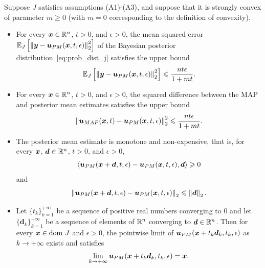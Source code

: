 \begin{prop} \label{prop:bounds_limits}
Suppose $J$ satisfies assumptions (A1)-(A3), and suppose that it is strongly convex of parameter $m \geqslant 0$ (with $m = 0$ corresponding to the definition of convexity).

\begin{itemize}
    \item[(i)] For every $\boldsymbol{x} \in \mathbb{R}^n$, $t>0$, and $\epsilon>0$, the mean squared error $\mathbb{E}_{J}\left [{\left\Vert{\boldsymbol{y}-\boldsymbol{u}_{PM}(\boldsymbol{x},t,\epsilon)} \right\Vert_{2}^{2}}\right]$ of the Bayesian posterior distribution~\eqref{eq:prob_dist_j} satisfies the upper bound 
    \begin{equation} \label{eq:mono_var_ub}
        \mathbb{E}_{J}\left [{\left\Vert{\boldsymbol{y}-\boldsymbol{u}_{PM}(\boldsymbol{x},t,\epsilon)} \right\Vert_{2}^{2}}\right] \leqslant \frac{nt\epsilon}{1+mt}.
    \end{equation}

    \item[(ii)] For every $\boldsymbol{x} \in \mathbb{R}^n$, $t>0$, and $\epsilon>0$, the squared difference between the MAP and posterior mean estimates satisfies the upper bound
    \begin{equation} \label{eq:difference_pm_map}
        \left\Vert{\boldsymbol{u}_{MAP}(\boldsymbol{x},t)-\boldsymbol{u}_{PM}(\boldsymbol{x},t,\epsilon)} \right\Vert_{2}^{2} \leqslant \frac{nt\epsilon}{1+mt}.
    \end{equation}
    
    \item[(iii)] The posterior mean estimate is monotone and non-expensive, that is, for every $\boldsymbol{x}$, $\boldsymbol{d} \in \mathbb{R}^n$, $t>0$, and $\epsilon>0$,
    \begin{equation} \label{eq:upm_monotone}
        \left\langle \boldsymbol{u}_{PM}(\boldsymbol{x} + \boldsymbol{d},t,\epsilon) - \boldsymbol{u}_{PM}(\boldsymbol{x},t,\epsilon), \boldsymbol{d} \right\rangle \geqslant 0
    \end{equation}
    and
    \begin{equation} \label{eq:lipschitz_cts}
         \left\Vert\boldsymbol{u}_{PM}(\boldsymbol{x} + \boldsymbol{d},t,\epsilon) -\boldsymbol{u}_{PM}(\boldsymbol{x},t,\epsilon)\right\Vert_2  \leqslant \left\Vert \boldsymbol{d}\right\Vert_2.
    \end{equation}
    \item[(iv)] Let $\{t_k\}_{k=1}^{+\infty}$ be a sequence of positive real numbers converging to $0$ and let $\{\boldsymbol{d}_k\}_{k=1}^{+\infty}$ be a sequence of elements of $\mathbb{R}^n$ converging to $\boldsymbol{d} \in \mathbb{R}^n$. Then for every $\boldsymbol{x} \in \mathrm{dom~} J$ and $\epsilon>0$, the pointwise limit of $\boldsymbol{u}_{PM}(\boldsymbol{x} + t_k\boldsymbol{d}_k,t_k,\epsilon)$ as $k\to +\infty$ exists and satisfies
    \[
        \lim_{k \to +\infty} \boldsymbol{u}_{PM}(\boldsymbol{x} + t_k\boldsymbol{d}_k,t_k,\epsilon) = \boldsymbol{x}.
    \]
\end{itemize}
\end{prop}

